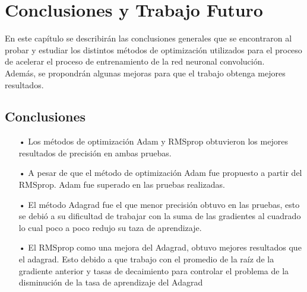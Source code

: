 \chapter{Conclusiones y Trabajo Futuro}
En este capítulo se describirán las conclusiones generales que se encontraron al probar y estudiar los distintos métodos de optimización utilizados para el proceso de acelerar el proceso de entrenamiento de la red neuronal convolución.\\ Además, se propondrán algunas mejoras para que el trabajo obtenga mejores resultados.


\section{Conclusiones}


\begin{itemize}

\item[•] Los métodos de optimización Adam y RMSprop obtuvieron los mejores resultados de precisión en ambas pruebas.
\item[•] A pesar de que el método de optimización Adam fue propuesto a partir del RMSprop. Adam fue superado en las pruebas realizadas.
\item[•] El método Adagrad fue el que menor precisión obtuvo en las pruebas, esto se debió a su dificultad de trabajar con la suma de las gradientes al cuadrado lo cual poco a poco redujo su taza de aprendizaje.
\item[•] El RMSprop como una mejora del Adagrad, obtuvo mejores resultados que el adagrad. Esto debido a que trabajo con el promedio de la raíz de la gradiente anterior y tasas de decaimiento para controlar el problema de la disminución de la tasa de aprendizaje del Adagrad

\end{itemize}


